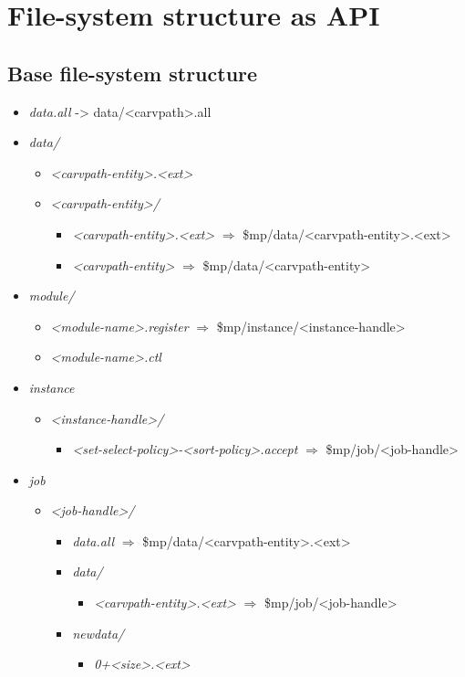 \chapter{File-system structure as API}
\section{Base file-system structure} 
\begin{itemize}
  \item \emph{data.all} -> data/<carvpath>.all 
  \item \emph{data/} 
  \begin{itemize}
    \item \emph{<carvpath-entity>.<ext>} 
    \item \emph{<carvpath-entity>/} 
    \begin{itemize}
      \item \emph{<carvpath-entity>.<ext>} $\Longrightarrow$ \$mp/data/<carvpath-entity>.<ext>
      \item \emph{<carvpath-entity>} $\Longrightarrow$ \$mp/data/<carvpath-entity>
    \end{itemize}
  \end{itemize}
  \item \emph{module/}
  \begin{itemize}
    \item \emph{<module-name>.register} $\Longrightarrow$ \$mp/instance/<instance-handle>
    \item \emph{<module-name>.ctl}
  \end{itemize}
  \item \emph{instance}
  \begin{itemize}
    \item \emph{<instance-handle>/}
    \begin{itemize}
      \item \emph{<set-select-policy>-<sort-policy>.accept} $\Longrightarrow$ \$mp/job/<job-handle>
    \end{itemize}
  \end{itemize}
  \item \emph{job}
  \begin{itemize}
    \item \emph{<job-handle>/}
    \begin{itemize}
      \item \emph{data.all} $\Longrightarrow$ \$mp/data/<carvpath-entity>.<ext>
      \item \emph{data/}
      \begin{itemize}
        \item \emph{<carvpath-entity>.<ext>} $\Longrightarrow$ \$mp/job/<job-handle>
      \end{itemize}
      \item \emph{newdata/}
      \begin{itemize}
        \item \emph{0+<size>.<ext>}
      \end{itemize}
    \end{itemize}
  \end{itemize}
\end{itemize}
